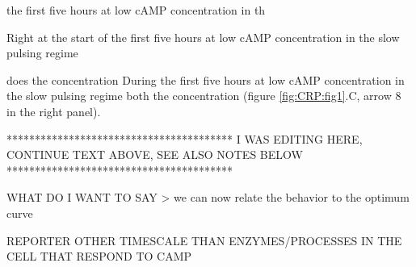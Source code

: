 the first five hours at low cAMP concentration in th

Right at the start of the first five hours at low cAMP concentration in the slow pulsing regime

does the concentration 
During the first five hours at low cAMP concentration in the slow pulsing regime both the concentration 
(figure \ref{fig:CRP:fig1}.C, arrow 8 in the right panel).

****************************************
I WAS EDITING HERE, CONTINUE TEXT ABOVE, SEE ALSO NOTES BELOW
****************************************

WHAT DO I WANT TO SAY
> we can now relate the behavior to the optimum curve


REPORTER OTHER TIMESCALE THAN ENZYMES/PROCESSES IN THE CELL THAT RESPOND TO CAMP
























